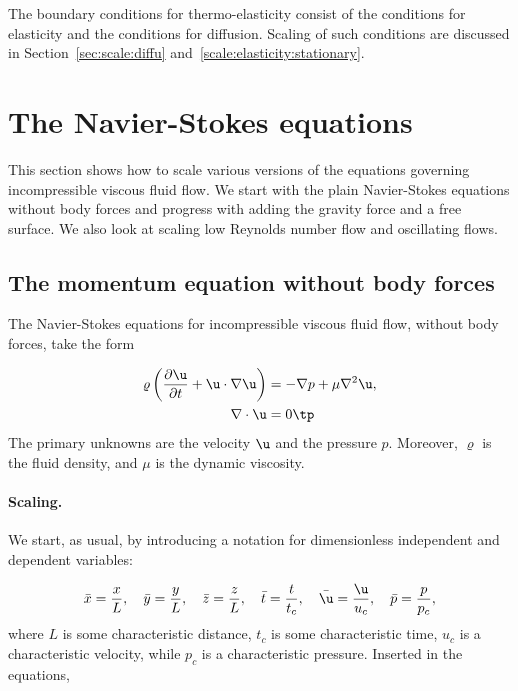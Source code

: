 \documentclass[graybox,envcountchap,sectrefs,final]{svmonodo}
\begin{document}
The boundary conditions for thermo-elasticity consist of the conditions
for elasticity and the conditions
for diffusion. Scaling of such conditions are discussed in
Section~\ref{sec:scale:diffu} and~\ref{scale:elasticity:stationary}.


\section{The Navier-Stokes equations}
\label{sec:scale:ns}


This section shows how to scale various versions of the
equations governing incompressible viscous fluid flow. We start
with the plain Navier-Stokes equations without body forces and
progress with adding the gravity force and a free surface. We
also look at scaling low Reynolds number flow and oscillating flows.

\subsection{The momentum equation without body forces}


The Navier-Stokes equations for incompressible viscous fluid flow,
without body forces, take the form

\begin{align}
\varrho\left(\frac{\partial \u}{\partial t} + \u\cdot\nabla\u\right)
&= -\nabla p + \mu\nabla^2\u,
\label{scale:fluid:NS:eq:momentum}\\ 
\nabla\cdot\u & = 0\tp
\label{scale:fluid:NS:eq:cont}
\end{align}
The primary unknowns are the
velocity $\u$ and the pressure $p$. Moreover,
$\varrho$ is the fluid density, and $\mu$ is the dynamic viscosity.

\paragraph{Scaling.}
We start, as usual, by introducing a notation for
dimensionless independent and dependent variables:

\[ \bar x = \frac{x}{L},\quad \bar y = \frac{y}{L},\quad
\bar z= \frac{z}{L},\quad \bar t = \frac{t}{t_c},\quad
\bar\u = \frac{\u}{u_c},\quad \bar p = \frac{p}{p_c},\]
where $L$ is some characteristic distance,
$t_c$ is some characteristic time, $u_c$ is a characteristic
velocity, while $p_c$ is a characteristic pressure.
Inserted in the equations,
\end{document}
